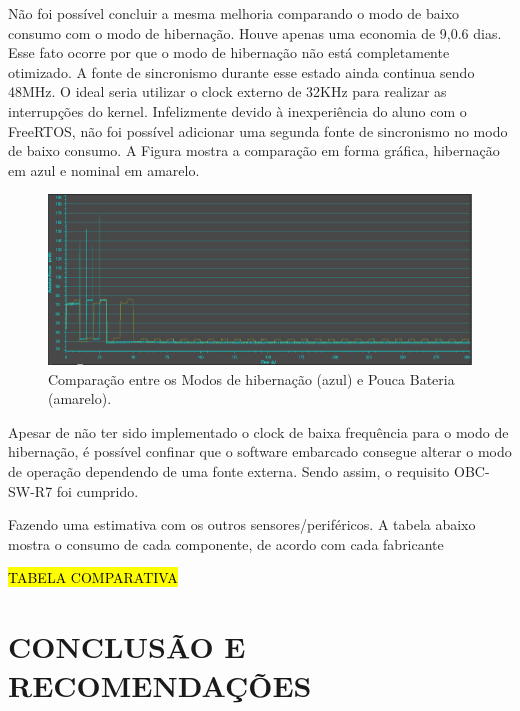 Não foi possível concluir a mesma melhoria comparando o modo de baixo consumo com o modo de hibernação. Houve apenas uma economia de 9\textperthousand,0.6 dias. Esse fato ocorre por que o modo de hibernação não está completamente otimizado. A fonte de sincronismo durante esse estado ainda continua sendo 48MHz. O ideal seria utilizar o clock externo de 32KHz para realizar as interrupções do kernel. Infelizmente devido à inexperiência do aluno com o FreeRTOS, não foi possível adicionar uma segunda fonte de sincronismo no modo de baixo consumo. A Figura mostra a comparação em forma gráfica, hibernação em azul e nominal em amarelo.

\begin{figure}[h]
	\centering
	\caption{Comparação entre os Modos de hibernação (azul) e Pouca Bateria (amarelo).}
	\includegraphics[keepaspectratio=true,scale=0.470]{figuras/hibernatexLBM.PNG}
	
	\label{hibernatexLBM}
\end{figure}

Apesar de não ter sido implementado o clock de baixa frequência para o modo de hibernação, é possível confinar que o software embarcado consegue alterar o modo de operação dependendo de uma fonte externa. Sendo assim, o requisito OBC-SW-R7 foi cumprido.

Fazendo uma estimativa com os outros sensores/periféricos. A tabela abaixo mostra o consumo de cada componente, de acordo com cada fabricante

\hl{TABELA COMPARATIVA}


\chapter[CONCLUSÃO E RECOMENDAÇÕES]{CONCLUSÃO E RECOMENDAÇÕES}

